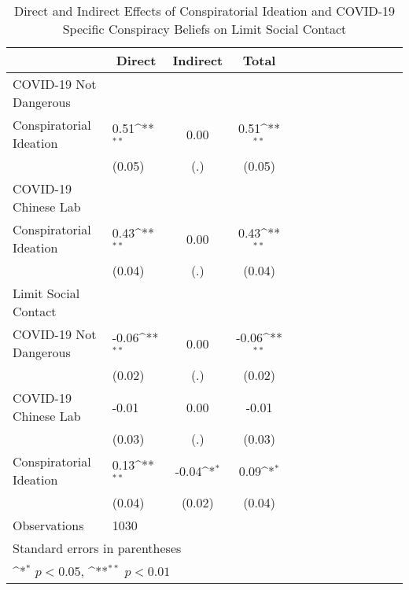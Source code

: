 \begin{table}[htbp]\centering
\def\sym#1{\ifmmode^{#1}\else\(^{#1}\)\fi}
\caption{Direct and Indirect Effects of Conspiratorial Ideation and COVID-19 Specific Conspiracy Beliefs on Limit Social Contact}
\begin{tabular}{l*{3}{l c c c}}
\hline\hline
                    &\multicolumn{1}{c}{Direct}&\multicolumn{1}{c}{Indirect}&\multicolumn{1}{c}{Total}\\
\hline
COVID-19 Not Dangerous&                    &                    &                    \\
Conspiratorial Ideation&        0.51\sym{**}&        0.00        &        0.51\sym{**}\\
                    &      (0.05)        &         (.)        &      (0.05)        \\
\hline
COVID-19 Chinese Lab&                    &                    &                    \\
Conspiratorial Ideation&        0.43\sym{**}&        0.00        &        0.43\sym{**}\\
                    &      (0.04)        &         (.)        &      (0.04)        \\
\hline
Limit Social Contact&                    &                    &                    \\
COVID-19 Not Dangerous&       -0.06\sym{**}&        0.00        &       -0.06\sym{**}\\
                    &      (0.02)        &         (.)        &      (0.02)        \\
[1em]
COVID-19 Chinese Lab&       -0.01        &        0.00        &       -0.01        \\
                    &      (0.03)        &         (.)        &      (0.03)        \\
[1em]
Conspiratorial Ideation&        0.13\sym{**}&       -0.04\sym{*} &        0.09\sym{*} \\
                    &      (0.04)        &      (0.02)        &      (0.04)        \\
\hline
Observations        &        1030        &                    &                    \\
\hline\hline
\multicolumn{4}{l}{\footnotesize Standard errors in parentheses}\\
\multicolumn{4}{l}{\footnotesize \sym{*} \(p<0.05\), \sym{**} \(p<0.01\)}\\
\end{tabular}
\end{table}
